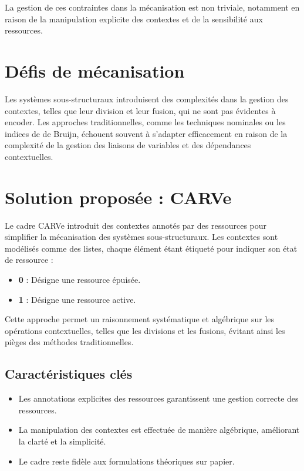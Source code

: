 La gestion de ces contraintes dans la mécanisation est non triviale, notamment en raison de la manipulation explicite des contextes et de la sensibilité aux ressources.

\section{Défis de mécanisation}
Les systèmes sous-structuraux introduisent des complexités dans la gestion des contextes, telles que leur division et leur fusion, qui ne sont pas évidentes à encoder. Les approches traditionnelles, comme les techniques nominales ou les indices de de Bruijn, échouent souvent à s'adapter efficacement en raison de la complexité de la gestion des liaisons de variables et des dépendances contextuelles.

\section{Solution proposée : CARVe}
Le cadre CARVe introduit des contextes annotés par des ressources pour simplifier la mécanisation des systèmes sous-structuraux. Les contextes sont modélisés comme des listes, chaque élément étant étiqueté pour indiquer son état de ressource :

\begin{itemize}
    \item \textbf{0} : Désigne une ressource épuisée.
    \item \textbf{1} : Désigne une ressource active.
\end{itemize}

Cette approche permet un raisonnement systématique et algébrique sur les opérations contextuelles, telles que les divisions et les fusions, évitant ainsi les pièges des méthodes traditionnelles.

\subsection{Caractéristiques clés}
\begin{itemize}
    \item Les annotations explicites des ressources garantissent une gestion correcte des ressources.
    \item La manipulation des contextes est effectuée de manière algébrique, améliorant la clarté et la simplicité.
    \item Le cadre reste fidèle aux formulations théoriques sur papier.
\end{itemize}

